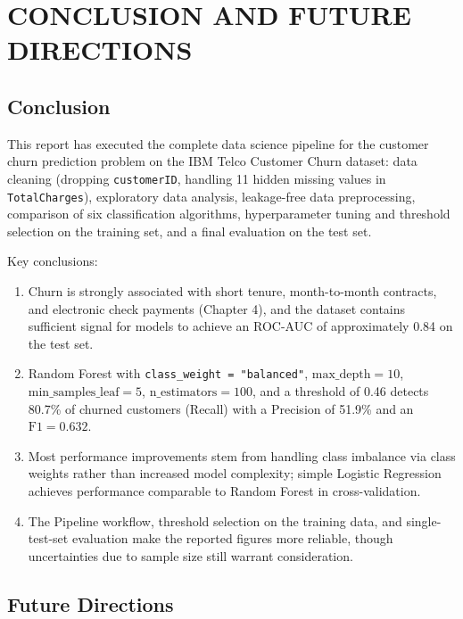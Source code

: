 \section{CONCLUSION AND FUTURE DIRECTIONS}

\subsection{Conclusion}

This report has executed the complete data science pipeline for the customer churn prediction problem on the IBM Telco Customer Churn dataset: data cleaning (dropping \texttt{customerID}, handling 11 hidden missing values in \texttt{TotalCharges}), exploratory data analysis, leakage-free data preprocessing, comparison of six classification algorithms, hyperparameter tuning and threshold selection on the training set, and a final evaluation on the test set.

Key conclusions:

\begin{enumerate}
    \item Churn is strongly associated with short tenure, month-to-month contracts, and electronic check payments (Chapter 4), and the dataset contains sufficient signal for models to achieve an ROC-AUC of approximately 0.84 on the test set.
    \item Random Forest with \texttt{class\_weight = "balanced"}, $\text{max\_depth} = 10$, $\text{min\_samples\_leaf} = 5$, $\text{n\_estimators} = 100$, and a threshold of 0.46 detects 80.7\% of churned customers (Recall) with a Precision of 51.9\% and an $\text{F1} = 0.632$.
    \item Most performance improvements stem from handling class imbalance via class weights rather than increased model complexity; simple Logistic Regression achieves performance comparable to Random Forest in cross-validation.
    \item The Pipeline workflow, threshold selection on the training data, and single-test-set evaluation make the reported figures more reliable, though uncertainties due to sample size still warrant consideration.
\end{enumerate}

\subsection{ Future Directions}

